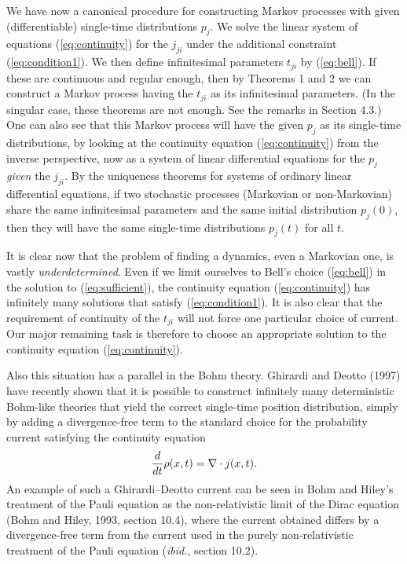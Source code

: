 \documentclass[12pt]{article}
\newcommand{\be}{\vspace*{6pt} \begin{equation}}
\newcommand{\ee}{\vspace*{10pt} \end{equation}}
\begin{document}
We have now a canonical procedure for constructing Markov processes 
with given (differentiable) single-time distributions $p_j$.  We solve 
the linear system of equations (\ref{eq:continuity}) for the $j_{ji}$ 
under the additional constraint (\ref{eq:condition1}).  We then define 
infinitesimal parameters $t_{ji}$ by (\ref{eq:bell}).  If these are 
continuous and regular enough, then by Theorems 1 and 2 we can 
construct a Markov process having the $t_{ji}$ as its infinitesimal 
parameters.  (In the singular case, these theorems are not enough.  
See the remarks in Section 4.3.) One can also see that this Markov 
process will have the given $p_j$ as its single-time distributions, by 
looking at the continuity equation (\ref{eq:continuity}) from the 
inverse perspective, now as a system of linear differential equations 
for the $p_j$ {\em given} the $j_{ji}$.  By the uniqueness theorems 
for systems of ordinary linear differential equations, if two 
stochastic processes (Markovian or non-Markovian) share the same 
infinitesimal parameters and the same initial distribution $p_j(0)$, 
then they will have the same single-time distributions $p_j(t)$ for 
all $t$.

It is clear now that the problem of finding a dynamics, even a 
Markovian one, is vastly {\em underdetermined}.  Even if we limit 
ourselves to Bell's choice (\ref{eq:bell}) in the solution to 
(\ref{eq:sufficient}), the continuity equation (\ref{eq:continuity}) 
has infinitely many solutions that satisfy (\ref{eq:condition1}).  It 
is also clear that the requirement of continuity of the $t_{ji}$ will 
not force one particular choice of current.  Our major remaining task 
is therefore to choose an appropriate solution to the continuity 
equation (\ref{eq:continuity}).

Also this situation has a parallel in the Bohm theory.  Ghirardi and 
Deotto (1997) have recently shown that it is possible to construct 
infinitely many deterministic Bohm-like theories that yield the 
correct single-time position distribution, simply by adding a 
divergence-free term to the standard choice for the probability 
current satisfying the continuity equation
\be
  \frac{d}{dt}\rho(x,t)=\nabla\cdot j(x,t).
\ee
An example of such a Ghirardi--Deotto current can be seen in Bohm and 
Hiley's treatment of the Pauli equation as the non-relativistic limit 
of the Dirac equation (Bohm and Hiley, 1993, section 10.4), where the 
current obtained differs by a divergence-free term from the current 
used in the purely non-relativistic treatment of the Pauli equation 
({\em ibid.}, section 10.2).
\end{document}
